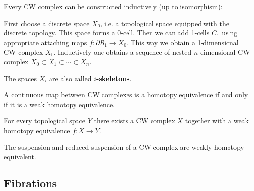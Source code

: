     \begin{construct}
        Every CW complex can be constructed inductively (up to isomorphism):

        \qquad First choose a discrete space $X_0$, i.e. a topological space equipped with the discrete topology. This space forms a 0-cell. Then we can add 1-cells $C_1$ using appropriate attaching maps $f:\partial\overline{B}_1\rightarrow X_0$. This way we obtain a 1-dimensional CW complex $X_1$. Inductively one obtains a sequence of nested $n$-dimensional CW complex $X_0\subset X_1\subset\cdots\subset X_n$.

        The spaces $X_i$ are also called \textbf{$i$-skeletons}.
    \end{construct}

    \begin{theorem}[Whitehead]
        A continuous map between CW complexes is a homotopy equivalence if and only if it is a weak homotopy equivalence.
    \end{theorem}
    \begin{theorem}
        For every topological space $Y$ there exists a CW complex $X$ together with a weak homotopy equivalence $f:X\rightarrow Y$.
    \end{theorem}

    \begin{property}[Suspensions]
        The suspension and reduced suspension of a CW complex are weakly homotopy equivalent.
    \end{property}

\subsection{Fibrations}

